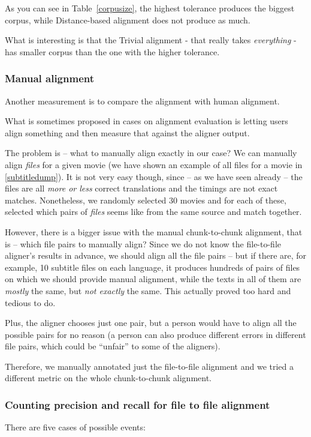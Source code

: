 As you can see in Table~\ref{corpusize}, the highest tolerance produces the biggest corpus, while Distance-based alignment does not produce as much.

What is interesting is that the Trivial alignment - that really takes \emph{everything} - has smaller corpus than the one with the higher tolerance.


\subsubsection{Manual alignment}
Another measurement is to compare the alignment with human alignment.

What is sometimes proposed in cases on alignment evaluation is letting users align something and then measure that against the aligner output.

The problem is -- what to manually align exactly in our case? We can manually align \emph{files} for a given movie (we have shown an example of all files for a movie in \ref{subtitledump}). It is not very easy though, since -- as we have seen already -- the files are all \emph{more or less} correct translations and the timings are not exact matches. Nonetheless, we randomly selected 30 movies and for each of these, selected which pairs of \emph{files} seems like from the same source and match together.

However, there is a bigger issue with the manual chunk-to-chunk alignment, that is -- which file pairs to manually align? Since we do not know the file-to-file aligner's results in advance, we should align all the file pairs -- but if there are, for example, 10 subtitle files on each language, it produces hundreds of pairs of files on which we should provide manual alignment, while the texts in all of them are \emph{mostly} the same, but \emph{not exactly} the same. This actually proved too hard and tedious to do.

Plus, the aligner chooses just one pair, but a person would have to align all the possible pairs for no reason (a person can also produce different errors in different file pairs, which could be ``unfair'' to some of the aligners).

Therefore, we manually annotated just the file-to-file alignment and we tried a different metric on the whole chunk-to-chunk alignment.



\subsubsection{Counting precision and recall for file to file alignment}
There are five cases of possible events:

